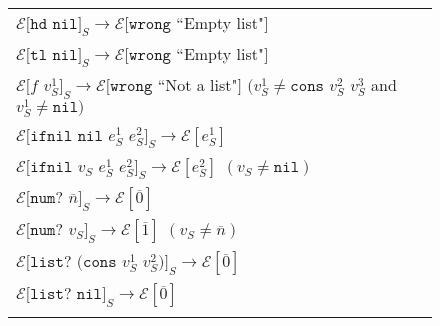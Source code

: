 \begin{figure}[ph!]
\begin{tabular}{l}
\vspace{5pt}

$\mathscr{E}[\mathtt{hd}$ $\mathtt{nil}]_{S}\rightarrow\mathscr{E}[\mathtt{wrong}$ ``Empty list"$]$ \\

\vspace{5pt}

$\mathscr{E}[\mathtt{tl}$ $\mathtt{nil}]_{S}\rightarrow\mathscr{E}[\mathtt{wrong}$ ``Empty list"$]$ \\

\vspace{5pt}

$\mathscr{E}[f$ $v_{S}^{1}]_{S}\rightarrow\mathscr{E}[\mathtt{wrong}$ ``Not a list"$]$ $(v_{S}^{1}\neq\mathtt{cons}$ $v_{S}^{2}$ $v_{S}^{3}$ and $v_{S}^{1}\neq\mathtt{nil})$ \\

\vspace{5pt}

$\mathscr{E}[\mathtt{ifnil}$ $\mathtt{nil}$ $e_{S}^{1}$ $e_{S}^{2}]_{S}\rightarrow\mathscr{E}[e_{S}^{1}]$ \\

\vspace{5pt}

$\mathscr{E}[\mathtt{ifnil}$ $v_{S}$ $e_{S}^{1}$ $e_{S}^{2}]_{S}\rightarrow\mathscr{E}[e_{S}^{2}]$ $(v_{S}\neq\mathtt{nil})$ \\

\vspace{5pt}

$\mathscr{E}[\mathtt{num?}$ $\overline{n}]_{S}\rightarrow\mathscr{E}[\overline{0}]$ \\

\vspace{5pt}

$\mathscr{E}[\mathtt{num?}$ $v_{S}]_{S}\rightarrow\mathscr{E}[\overline{1}]$ $(v_{S}\neq\overline{n})$ \\

\vspace{5pt}

$\mathscr{E}[\mathtt{list?}$ $(\mathtt{cons}$ $v_{S}^{1}$ $v_{S}^{2})]_{S}\rightarrow\mathscr{E}[\overline{0}]$ \\

\vspace{5pt}

$\mathscr{E}[\mathtt{list?}$ $\mathtt{nil}]_{S}\rightarrow\mathscr{E}[\overline{0}]$ \\

\vspace{5pt}


\end{tabular}
\end{figure}
